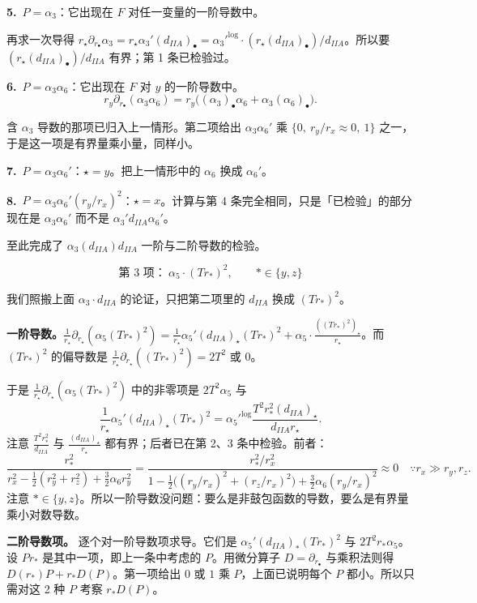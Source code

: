 \medskip
\noindent\textbf{5.}\ $P=\alpha_3$：它出现在 $F$ 对任一变量的一阶导数中。

再求一次导得 $r_\star\partial_{r_\bullet}\alpha_3=r_\star\alpha_3'(d_{IIA})_\bullet={\alpha_3'}^{\log}\cdot(r_\star(d_{IIA})_\bullet)/d_{IIA}$。所以要 $(r_\star(d_{IIA})_\bullet)/d_{IIA}$ 有界；第 1 条已检验过。

\medskip
\noindent\textbf{6.}\ $P=\alpha_3\alpha_6$：它出现在 $F$ 对 $y$ 的一阶导数中。
\[
r_y\partial_{r_\bullet}(\alpha_3\alpha_6)=r_y\big((\alpha_3)_\bullet\alpha_6+\alpha_3(\alpha_6)_\bullet\big).
\]

含 $\alpha_3$ 导数的那项已归入上一情形。第二项给出 $\alpha_3\alpha_6'$ 乘 $\{0,\ r_y/r_x\approx0,\ 1\}$ 之一，于是这一项是有界量乘小量，同样小。

\medskip
\noindent\textbf{7.}\ $P=\alpha_3\alpha_6'$：$\star=y$。把上一情形中的 $\alpha_6$ 换成 $\alpha_6'$。

\medskip
\noindent\textbf{8.}\ $P=\alpha_3\alpha_6'(r_y/r_x)^2$：$\star=x$。计算与第 4 条完全相同，只是「已检验」的部分现在是 $\alpha_3\alpha_6'$ 而不是 $\alpha_3'd_{IIA}\alpha_6'$。

至此完成了 $\alpha_3(d_{IIA})d_{IIA}$ 一阶与二阶导数的检验。

\[
\text{第 3 项：}\ \alpha_5\cdot(Tr_*)^2,\qquad *\in\{y,z\}
\]

我们照搬上面 $\alpha_3\cdot d_{IIA}$ 的论证，只把第二项里的 $d_{IIA}$ 换成 $(Tr_*)^2$。

\medskip
\noindent\textbf{一阶导数。}$\frac{1}{r_\star}\partial_{r_\star}(\alpha_5(Tr_*)^2)=\frac{1}{r_\star}\alpha_5'(d_{IIA})_\star(Tr_*)^2+\alpha_5\cdot\frac{((Tr_*)^2)_\star}{r_\star}$。而 $(Tr_*)^2$ 的偏导数是 $\frac{1}{r_\star}\partial_{r_\star}((Tr_*)^2)=2T^2$ 或 $0$。

于是 $\frac{1}{r_\star}\partial_{r_\star}(\alpha_5(Tr_*)^2)$ 中的非零项是 $2T^2\alpha_5$ 与
\[
\frac{1}{r_\star}\alpha_5'(d_{IIA})_\star(Tr_*)^2={\alpha_5'}^{\log}\frac{T^2r_*^2(d_{IIA})_\star}{d_{IIA}r_\star}.
\]
注意 $\frac{T^2r_*^2}{d_{IIA}}$ 与 $\frac{(d_{IIA})_\star}{r_\star}$ 都有界；后者已在第 2、3 条中检验。前者：
\[
\frac{r_*^2}{r_x^2-\frac12(r_y^2+r_z^2)+\frac32\alpha_6r_y^2}
=\frac{r_*^2/r_x^2}{1-\frac12\big((r_y/r_x)^2+(r_z/r_x)^2\big)+\frac32\alpha_6(r_y/r_x)^2}
\approx0\quad\because r_x\gg r_y,r_z.
\]
注意 $*\in\{y,z\}$。所以一阶导数没问题：要么是非鼓包函数的导数，要么是有界量乘小对数导数。

\medskip
\noindent\textbf{二阶导数项。} 逐个对一阶导数项求导。它们是 $\alpha_5'(d_{IIA})_*(Tr_*)^2$ 与 $2T^2r_*\alpha_5$。设 $Pr_*$ 是其中一项，即上一条中考虑的 $P$。用微分算子 $D=\partial_{r_\bullet}$ 与乘积法则得 $D(r_*)P+r_*D(P)$。第一项给出 $0$ 或 $1$ 乘 $P$，上面已说明每个 $P$ 都小。所以只需对这 2 种 $P$ 考察 $r_*D(P)$。

